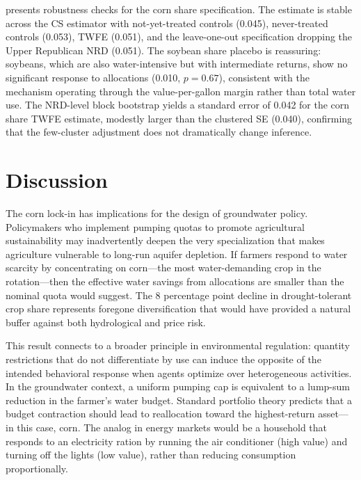 \documentclass[12pt]{article}
\begin{document}
 presents robustness checks for the corn share specification. The estimate is stable across the CS estimator with not-yet-treated controls (0.045), never-treated controls (0.053), TWFE (0.051), and the leave-one-out specification dropping the Upper Republican NRD (0.051). The soybean share placebo is reassuring: soybeans, which are also water-intensive but with intermediate returns, show no significant response to allocations (0.010, $p = 0.67$), consistent with the mechanism operating through the value-per-gallon margin rather than total water use. The NRD-level block bootstrap yields a standard error of 0.042 for the corn share TWFE estimate, modestly larger than the clustered SE (0.040), confirming that the few-cluster adjustment does not dramatically change inference.


\section{Discussion}

The corn lock-in has implications for the design of groundwater policy. Policymakers who implement pumping quotas to promote agricultural sustainability may inadvertently deepen the very specialization that makes agriculture vulnerable to long-run aquifer depletion. If farmers respond to water scarcity by concentrating on corn---the most water-demanding crop in the rotation---then the effective water savings from allocations are smaller than the nominal quota would suggest. The 8 percentage point decline in drought-tolerant crop share represents foregone diversification that would have provided a natural buffer against both hydrological and price risk.

This result connects to a broader principle in environmental regulation: quantity restrictions that do not differentiate by use can induce the opposite of the intended behavioral response when agents optimize over heterogeneous activities. In the groundwater context, a uniform pumping cap is equivalent to a lump-sum reduction in the farmer's water budget. Standard portfolio theory predicts that a budget contraction should lead to reallocation toward the highest-return asset---in this case, corn. The analog in energy markets would be a household that responds to an electricity ration by running the air conditioner (high value) and turning off the lights (low value), rather than reducing consumption proportionally.
\end{document}
